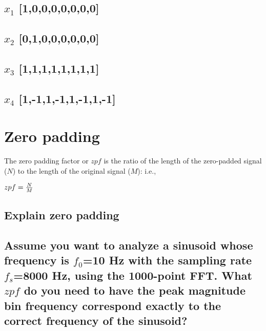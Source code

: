 \documentclass[12pt]{article}%
\begin{document}
\subsection{$x_1$ [1,0,0,0,0,0,0,0]}
\subsection{$x_2$ [0,1,0,0,0,0,0,0]}
\subsection{$x_3$ [1,1,1,1,1,1,1,1]}
\subsection{$x_4$ [1,-1,1,-1,1,-1,1,-1]}

\section{Zero padding}
The zero padding factor or $zpf$ is the ratio of the length of the zero-padded signal ($N$) to the length of the original signal ($M$): i.e.,\\
\begin{center}
    $zpf = {N \over M}$
\end{center}
\subsection{Explain zero padding}
\subsection{Assume you want to analyze a sinusoid whose frequency is $f_0$=10  Hz with the sampling rate  $f_s$=8000  Hz, using the 1000-point FFT. What $zpf$ do you need to have the peak magnitude bin frequency correspond exactly to the correct frequency of the sinusoid?}
\end{document}
